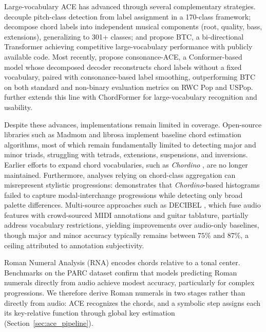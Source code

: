 \documentclass{article}
\begin{document}
Large-vocabulary ACE has advanced through several complementary strategies. \citet{mcfee2017structured} decouple pitch-class detection from label assignment in a 170-class framework; \citet{jiang2019large} decompose chord labels into independent musical components (root, quality, bass, extensions), generalizing to 301+ classes; and \citet{park2019bi} propose BTC, a bi-directional Transformer achieving competitive large-vocabulary performance with publicly available code. Most recently, \citet{poltronieri2025discord} propose consonance-ACE, a Conformer-based model whose decomposed decoder reconstructs chord labels without a fixed vocabulary, paired with consonance-based label smoothing, outperforming BTC on both standard and non-binary evaluation metrics on RWC Pop and USPop. \citet{waseem2025chordformer} further extends this line with ChordFormer for large-vocabulary recognition and usability.

Despite these advances, implementations remain limited in coverage. Open-source libraries such as Madmom \citep{bock2016madmom} and librosa \citep{mcfee2025librosa} implement baseline chord estimation algorithms, most of which remain fundamentally limited to detecting major and minor triads, struggling with tetrads, extensions, suspensions, and inversions. Earlier efforts to expand chord vocabularies, such as \textit{Chordino} \citep{mauch2010approximate}, are no longer maintained. Furthermore, analyses relying on chord-class aggregation can misrepresent stylistic progressions: \citet{collins2025recording} demonstrates that \textit{Chordino}-based histograms failed to capture modal-interchange progressions while detecting only broad palette differences. Multi-source approaches such as DECIBEL \citep{odekerken2020decibel}, which fuse audio features with crowd-sourced MIDI annotations and guitar tablature, partially address vocabulary restrictions, yielding improvements over audio-only baselines, though major and minor accuracy typically remains between $75\%$ and $87\%$, a ceiling attributed to annotation subjectivity.

Roman Numeral Analysis (RNA) encodes chords relative to a tonal center. Benchmarks on the PARC dataset \citep{poppe2025polyphonic} confirm that models predicting Roman numerals directly from audio achieve modest accuracy, particularly for complex progressions. We therefore derive Roman numerals in two stages rather than directly from audio: ACE recognizes the chords, and a symbolic step assigns each its key-relative function through global key estimation (Section~\ref{sec:ace_pipeline}).
\end{document}
